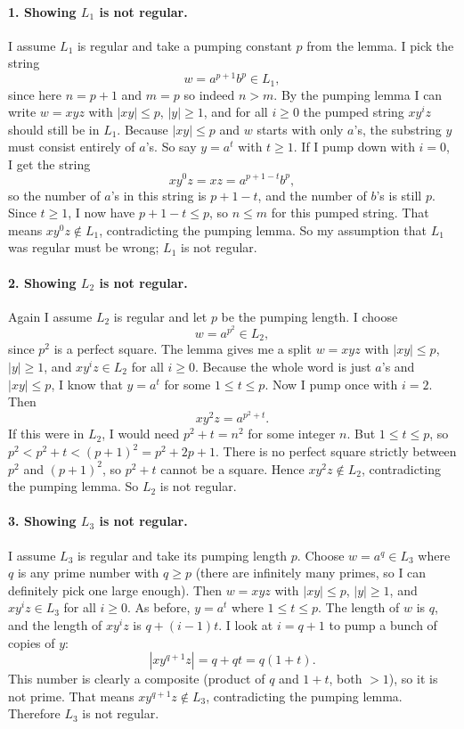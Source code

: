 \documentclass{article}
\theoremstyle{theorem}
\theoremstyle{definition}
\theoremstyle{remark}
\begin{document}
\paragraph{1. Showing $L_1$ is not regular.}
I assume $L_1$ is regular and take a pumping constant $p$ from the lemma. I pick the string
\[
w = a^{p+1} b^{p} \in L_1,
\]
since here $n = p+1$ and $m = p$ so indeed $n > m$. By the pumping lemma I can write $w = xyz$ with $|xy| \le p$, $|y| \ge 1$, and for all $i \ge 0$ the pumped string $xy^i z$ should still be in $L_1$.\newline
Because $|xy| \le p$ and $w$ starts with only $a$'s, the substring $y$ must consist entirely of $a$'s. So say $y = a^t$ with $t \ge 1$. If I pump down with $i = 0$, I get the string
\[
xy^0 z = xz = a^{p+1 - t} b^p,
\]
so the number of $a$'s in this string is $p+1-t$, and the number of $b$'s is still $p$. Since $t \ge 1$, I now have $p+1-t \le p$, so $n \le m$ for this pumped string. That means $xy^0 z \notin L_1$, contradicting the pumping lemma. So my assumption that $L_1$ was regular must be wrong; $L_1$ is not regular.

\paragraph{2. Showing $L_2$ is not regular.}
Again I assume $L_2$ is regular and let $p$ be the pumping length. I choose
\[
w = a^{p^2} \in L_2,
\]
since $p^2$ is a perfect square. The lemma gives me a split $w = xyz$ with $|xy| \le p$, $|y| \ge 1$, and $xy^i z \in L_2$ for all $i \ge 0$. Because the whole word is just $a$'s and $|xy| \le p$, I know that $y = a^t$ for some $1 \le t \le p$.\newline
Now I pump once with $i = 2$. Then
\[
xy^2 z = a^{p^2 + t}.
\]
If this were in $L_2$, I would need $p^2 + t = n^2$ for some integer $n$. But $1 \le t \le p$, so $p^2 < p^2 + t < (p+1)^2 = p^2 + 2p + 1$. There is no perfect square strictly between $p^2$ and $(p+1)^2$, so $p^2 + t$ cannot be a square. Hence $xy^2 z \notin L_2$, contradicting the pumping lemma. So $L_2$ is not regular.

\paragraph{3. Showing $L_3$ is not regular.}
I assume $L_3$ is regular and take its pumping length $p$. Choose $w = a^q \in L_3$ where $q$ is any prime number with $q \ge p$ (there are infinitely many primes, so I can definitely pick one large enough). Then $w = xyz$ with $|xy| \le p$, $|y| \ge 1$, and $xy^i z \in L_3$ for all $i \ge 0$. As before, $y = a^t$ where $1 \le t \le p$.\newline
The length of $w$ is $q$, and the length of $xy^i z$ is $q + (i-1)t$. I look at $i = q+1$ to pump a bunch of copies of $y$:
\[
|xy^{q+1} z| = q + q t = q(1+t).
\]
This number is clearly a composite (product of $q$ and $1+t$, both $>1$), so it is not prime. That means $xy^{q+1} z \notin L_3$, contradicting the pumping lemma. Therefore $L_3$ is not regular.
\end{document}
